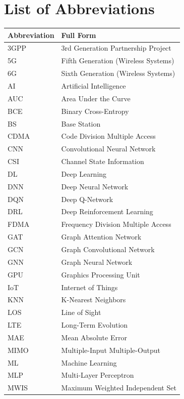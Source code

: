 \chapter*{List of Abbreviations}

\vspace{0.5cm}

\begin{longtable}{p{3cm} p{11cm}}
\toprule
\textbf{Abbreviation} & \textbf{Full Form} \\
\midrule
\endhead

3GPP & 3rd Generation Partnership Project \\
5G & Fifth Generation (Wireless Systems) \\
6G & Sixth Generation (Wireless Systems) \\
AI & Artificial Intelligence \\
AUC & Area Under the Curve \\
BCE & Binary Cross-Entropy \\
BS & Base Station \\
CDMA & Code Division Multiple Access \\
CNN & Convolutional Neural Network \\
CSI & Channel State Information \\
DL & Deep Learning \\
DNN & Deep Neural Network \\
DQN & Deep Q-Network \\
DRL & Deep Reinforcement Learning \\
FDMA & Frequency Division Multiple Access \\
GAT & Graph Attention Network \\
GCN & Graph Convolutional Network \\
GNN & Graph Neural Network \\
GPU & Graphics Processing Unit \\
IoT & Internet of Things \\
KNN & K-Nearest Neighbors \\
LOS & Line of Sight \\
LTE & Long-Term Evolution \\
MAE & Mean Absolute Error \\
MIMO & Multiple-Input Multiple-Output \\
ML & Machine Learning \\
MLP & Multi-Layer Perceptron \\
MWIS & Maximum Weighted Independent Set \\

\end{longtable}
